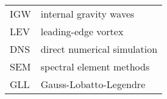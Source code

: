 %
%
%
%

\begin{acronyms}

\renewcommand{\arraystretch}{1.5}
\setlength{\tabcolsep}{3mm}
{\begin {tabular}{ll}
IGW & internal gravity waves\\
LEV & leading-edge vortex\\
DNS & direct numerical simulation\\
SEM & spectral element methods\\
GLL & Gauss-Lobatto-Legendre\\
\end {tabular}}

\end{acronyms}

